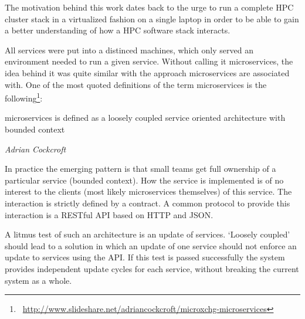 The motivation behind this work dates back to the urge to run a complete HPC cluster stack in a virtualized fashion on a single laptop in order to be able to gain a better understanding of how a HPC software stack interacts.

All services were put into a distinced machines, which only served an environment needed to run a given service.
Without calling it microservices, the idea behind it was quite similar with the approach microservices are associated with.
One of the most quoted definitions of the term microservices is the following\footnote{\Mundus~\url{http://www.slideshare.net/adriancockcroft/microxchg-microservices}}:
\epigraph{microservices is defined as a loosely coupled service oriented architecture with bounded context}{\textit{Adrian Cockcroft}}
In practice the emerging pattern is that small teams get full ownership of a particular service (bounded context).
How the service is implemented is of no interest to the clients (most likely microservices themselves) of this service.
The interaction is strictly defined by a contract. A common protocol to provide this interaction is a RESTful API based on HTTP and JSON.

A litmus test of such an architecture is an update of services. `Loosely coupled' should lead to a solution in which an update of one service
should not enforce an update to services using the API. If this test is passed successfully the system provides
independent update cycles for each service, without breaking the current system as a whole.

